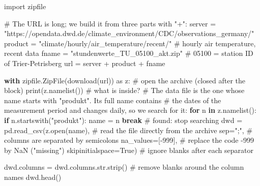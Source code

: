 \documentclass[
  letterpaper,
  DIV=11,
  numbers=noendperiod]{scrreprt}
\newenvironment{Shaded}{\begin{snugshade}}{\end{snugshade}}
\newcommand{\BuiltInTok}[1]{\textcolor[rgb]{0.00,0.23,0.31}{#1}}
\newcommand{\CommentTok}[1]{\textcolor[rgb]{0.37,0.37,0.37}{#1}}
\newcommand{\ControlFlowTok}[1]{\textcolor[rgb]{0.00,0.23,0.31}{\textbf{#1}}}
\newcommand{\DecValTok}[1]{\textcolor[rgb]{0.68,0.00,0.00}{#1}}
\newcommand{\ImportTok}[1]{\textcolor[rgb]{0.00,0.46,0.62}{#1}}
\newcommand{\KeywordTok}[1]{\textcolor[rgb]{0.00,0.23,0.31}{\textbf{#1}}}
\newcommand{\NormalTok}[1]{\textcolor[rgb]{0.00,0.23,0.31}{#1}}
\newcommand{\OperatorTok}[1]{\textcolor[rgb]{0.37,0.37,0.37}{#1}}
\newcommand{\StringTok}[1]{\textcolor[rgb]{0.13,0.47,0.30}{#1}}
\newcommand{\VariableTok}[1]{\textcolor[rgb]{0.07,0.07,0.07}{#1}}
\begin{document}
\begin{tcolorbox}
\begin{Shaded}
\begin{Highlighting}[]
\ImportTok{import}\NormalTok{ zipfile}

\CommentTok{\# The URL is long; we build it from three parts with "+":}
\NormalTok{server  }\OperatorTok{=} \StringTok{"https://opendata.dwd.de/climate\_environment/CDC/observations\_germany/"}
\NormalTok{product }\OperatorTok{=} \StringTok{"climate/hourly/air\_temperature/recent/"}   \CommentTok{\# hourly air temperature, recent data}
\NormalTok{fname   }\OperatorTok{=} \StringTok{"stundenwerte\_TU\_05100\_akt.zip"}           \CommentTok{\# 05100 = station ID of Trier{-}Petrisberg}
\NormalTok{url }\OperatorTok{=}\NormalTok{ server }\OperatorTok{+}\NormalTok{ product }\OperatorTok{+}\NormalTok{ fname}

\ControlFlowTok{with}\NormalTok{ zipfile.ZipFile(download(url)) }\ImportTok{as}\NormalTok{ z:       }\CommentTok{\# open the archive (closed after the block)}
    \BuiltInTok{print}\NormalTok{(z.namelist())                         }\CommentTok{\# what is inside?}
    \CommentTok{\# The data file is the one whose name starts with "produkt". Its full name contains}
    \CommentTok{\# the dates of the measurement period and changes daily, so we search for it:}
    \ControlFlowTok{for}\NormalTok{ n }\KeywordTok{in}\NormalTok{ z.namelist():}
        \ControlFlowTok{if}\NormalTok{ n.startswith(}\StringTok{"produkt"}\NormalTok{):}
\NormalTok{            name }\OperatorTok{=}\NormalTok{ n}
            \ControlFlowTok{break}                               \CommentTok{\# found: stop searching}
\NormalTok{    dwd }\OperatorTok{=}\NormalTok{ pd.read\_csv(z.}\BuiltInTok{open}\NormalTok{(name),             }\CommentTok{\# read the file directly from the archive}
\NormalTok{                      sep}\OperatorTok{=}\StringTok{";"}\NormalTok{,                  }\CommentTok{\# columns are separated by semicolons}
\NormalTok{                      na\_values}\OperatorTok{=}\NormalTok{[}\OperatorTok{{-}}\DecValTok{999}\NormalTok{],         }\CommentTok{\# replace the code {-}999 by NaN ("missing")}
\NormalTok{                      skipinitialspace}\OperatorTok{=}\VariableTok{True}\NormalTok{)    }\CommentTok{\# ignore blanks after each separator}

\NormalTok{dwd.columns }\OperatorTok{=}\NormalTok{ dwd.columns.}\BuiltInTok{str}\NormalTok{.strip()           }\CommentTok{\# remove blanks around the column names}
\NormalTok{dwd.head()}
\end{Highlighting}
\end{Shaded}


\end{tcolorbox}
\end{document}
